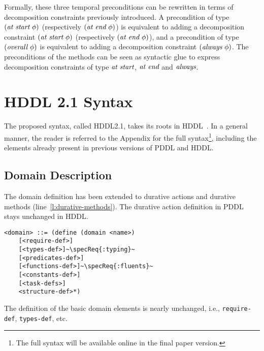 \documentclass[letterpaper]{article} %
\newcommand{\atstart}{\text{\it at start}}
\newcommand{\atend}{\text{\it at end}}
\newcommand{\always}{\text{\it always}}
\newcommand{\overall}{\text{\it overall}}
\begin{document}
Formally, these three temporal preconditions can be rewritten in terms of decomposition constraints previously introduced. A precondition of type $(\atstart \ \phi)$ (respectively $(\atend \ \phi)$) is equivalent to adding a decomposition constraint $(\atstart \ \phi)$ (respectively $(\atend \ \phi)$), and a precondition of type $(\overall \ \phi)$ is equivalent to adding a decomposition constraint $(\always \ \phi)$. The preconditions of the methods can be seen as syntactic glue to express decomposition constraints of type $\atstart$, $\atend$ and $\always$.

\section{HDDL 2.1 Syntax}

The proposed syntax, called HDDL2.1, takes its roots in HDDL~\citep{holler20}. In a general manner, the reader is referred to the Appendix for the full syntax\footnote{The full syntax will be available online in the final paper version.}, including the elements already present in previous versions of PDDL and HDDL.

\subsection{Domain Description}

\newcommand{\specReq}[1]{\ensuremath{\mathtt{^{#1}}}}

The domain definition has been extended to durative actions %
and durative methods (line~\ref{l:durative-methods}). The durative action definition in PDDL stays unchanged in HDDL.
\begin{lstlisting}[escapechar=~]
<domain> ::= (define (domain <name>)
    [<require-def>]
    [<types-def>]~\specReq{:typing}~
    [<predicates-def>]
    [<functions-def>]~\specReq{:fluents}~
    [<constants-def>]
    [<task-defs>]
    <structure-def>*)
\end{lstlisting}

%
%
%

The definition of the basic domain elements is nearly unchanged, i.e., {\tt require-def}, {\tt types-def}, etc.
\end{document}

